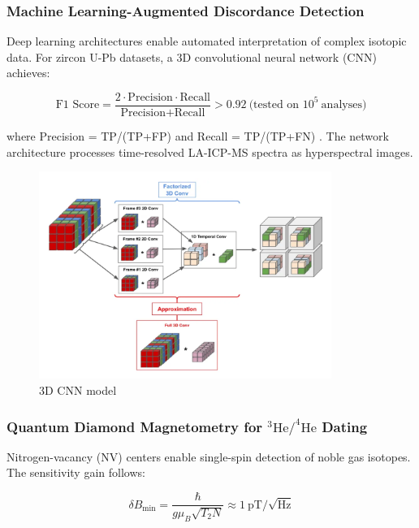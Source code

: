 \documentclass{article}
\begin{document}
\subsubsection*{Machine Learning-Augmented Discordance Detection}
Deep learning architectures enable automated interpretation of complex isotopic data. For zircon U-Pb datasets, a 3D convolutional neural network (CNN) achieves:

\begin{equation}
\text{F1 Score} = \frac{2 \cdot \text{Precision} \cdot \text{Recall}}{\text{Precision} + \text{Recall}} > 0.92\ \text{(tested on 10}^5\ \text{analyses)}
\label{eq:f1_score}
\end{equation}

where Precision = TP/(TP+FP) and Recall = TP/(TP+FN) \cite{Spencer2022}. The network architecture processes time-resolved LA-ICP-MS spectra as hyperspectral images.

\begin{figure}[htbp]
    \centering
    \includegraphics[width=0.85\textwidth]{3D_CNN.png}
    \caption{3D CNN model}
    \label{fig:3D_CNN}
\end{figure}
\subsubsection*{Quantum Diamond Magnetometry for \(^{3}\text{He}/^{4}\text{He}\) Dating}
Nitrogen-vacancy (NV) centers enable single-spin detection of noble gas isotopes. The sensitivity gain follows:

\begin{equation}
\delta B_{\text{min}} = \frac{\hbar}{g\mu_B\sqrt{T_2N}} \approx 1\ \text{pT}/\sqrt{\text{Hz}}
\label{eq:nv_sensitivity}
\end{equation}
\end{document}

